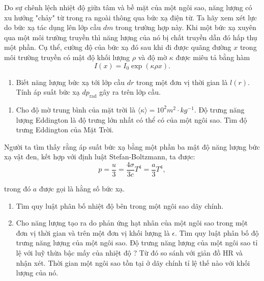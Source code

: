 Do sự chênh lệch nhiệt độ giữa tâm và bề mặt của một ngôi sao, năng lượng có xu hướng "chảy" từ trong ra ngoài thông qua bức xạ điện từ. Ta hãy xem xét lực do bức xạ tác dụng lên lớp cầu $dm$ trong trường hợp này.
Khi một bức xạ xuyên qua một môi trường truyền thì năng lượng của nó bị chất truyền dẫn đó hấp thụ một phần. Cụ thể, cường độ của bức xạ đó sau khi đi được quãng đường $x$ trong môi trường truyền có mật độ khối lượng $\rho$ và độ mờ $\kappa$ được miêu tả bằng hàm
\begin{equation}
    I(x)=I_0 \exp{(\kappa \rho x)}.
\end{equation}
\begin{enumerate}[resume]
    \item Biết năng lượng bức xạ tới lớp cầu $dr$ trong một đơn vị thời gian là $l(r)$. Tính áp suất bức xạ $dp_{\text{rad}}$ gây ra trên lớp cầu.
    
\end{enumerate}
\begin{enumerate}[resume]
    \item Cho độ mờ trung bình của mặt trời là $\langle \kappa \rangle = 10^2 \si{m^2 \cdot kg^{-1}}$. Độ trưng năng lượng Eddington là độ trưng lớn nhất có thể có của một ngôi sao. Tìm độ trưng Eddington của Mặt Trời.
\end{enumerate}
Người ta tìm thấy rằng áp suất bức xạ bằng một phần ba mật độ năng lượng bức xạ vật đen, kết hợp với định luật Stefan-Boltzmann, ta được: 
\begin{equation}
    p=\dfrac{u}{3}=\dfrac{4\sigma}{3c} T^4 = \dfrac{a}{3}T^4 ,
\end{equation} 

trong đó $a$ được gọi là hằng số bức xạ.
\begin{enumerate}[resume]
    \item Tìm quy luật phân bố nhiệt độ bên trong một ngôi sao dãy chính.   
    \item Cho năng lượng tạo ra do phản ứng hạt nhân của một ngôi sao trong một đơn vị thời gian và trên một đơn vị khối lượng là $\epsilon$. Tìm quy luật phân bố độ trưng năng lượng của một ngôi sao. Độ trưng năng lượng của một ngôi sao tỉ lệ với luỹ thừa bậc mấy của nhiệt độ ? Từ đó so sánh với giản đồ HR và nhận xét. Thời gian một ngôi sao tồn tại ở dãy chính tỉ lệ thế nào với khối lượng của nó.
\end{enumerate}


